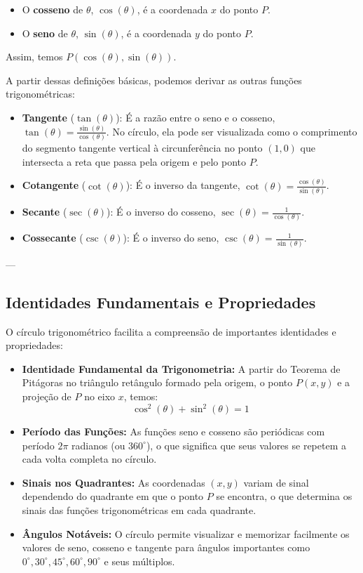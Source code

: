 \documentclass{article}
\begin{document}
\begin{itemize}
    \item O \textbf{cosseno} de $\theta$, $\cos(\theta)$, é a coordenada $x$ do ponto $P$.
    \item O \textbf{seno} de $\theta$, $\sin(\theta)$, é a coordenada $y$ do ponto $P$.
\end{itemize}

Assim, temos $P(\cos(\theta), \sin(\theta))$.

A partir dessas definições básicas, podemos derivar as outras funções trigonométricas:

\begin{itemize}
    \item \textbf{Tangente} (${\tan(\theta)}$): É a razão entre o seno e o cosseno, ${\tan(\theta) = \frac{\sin(\theta)}{\cos(\theta)}}$. No círculo, ela pode ser visualizada como o comprimento do segmento tangente vertical à circunferência no ponto $(1,0)$ que intersecta a reta que passa pela origem e pelo ponto $P$.
    \item \textbf{Cotangente} (${\cot(\theta)}$): É o inverso da tangente, ${\cot(\theta) = \frac{\cos(\theta)}{\sin(\theta)}}$.
    \item \textbf{Secante} (${\sec(\theta)}$): É o inverso do cosseno, ${\sec(\theta) = \frac{1}{\cos(\theta)}}$.
    \item \textbf{Cossecante} (${\csc(\theta)}$): É o inverso do seno, ${\csc(\theta) = \frac{1}{\sin(\theta)}}$.
\end{itemize}

---

\subsection*{Identidades Fundamentais e Propriedades}

O círculo trigonométrico facilita a compreensão de importantes identidades e propriedades:

\begin{itemize}
    \item \textbf{Identidade Fundamental da Trigonometria:} A partir do Teorema de Pitágoras no triângulo retângulo formado pela origem, o ponto $P(x,y)$ e a projeção de $P$ no eixo $x$, temos:
    $$\cos^2(\theta) + \sin^2(\theta) = 1$$
    \item \textbf{Período das Funções:} As funções seno e cosseno são periódicas com período $2\pi$ radianos (ou $360^\circ$), o que significa que seus valores se repetem a cada volta completa no círculo.
    \item \textbf{Sinais nos Quadrantes:} As coordenadas $(x,y)$ variam de sinal dependendo do quadrante em que o ponto $P$ se encontra, o que determina os sinais das funções trigonométricas em cada quadrante.
    \item \textbf{Ângulos Notáveis:} O círculo permite visualizar e memorizar facilmente os valores de seno, cosseno e tangente para ângulos importantes como $0^\circ, 30^\circ, 45^\circ, 60^\circ, 90^\circ$ e seus múltiplos.
\end{itemize}
\end{document}
